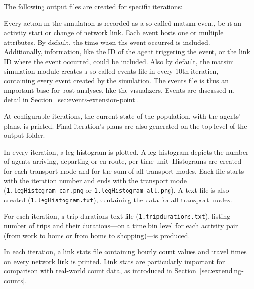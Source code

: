 The following output files are created for specific iterations:
\begin{description}\styleDescription

\item[Events:] Every action in the simulation is recorded as a so-called \gls{matsim} \gls{event}, be it an activity start or change of network link. Each \gls{event} hosts one or multiple attributes. By default, the time when the \gls{event} occurred is included. Additionally, information, like the ID of the agent triggering the event, or the link ID where the \gls{event} occurred, could be included. Also by default, the \gls{matsim} simulation module creates a so-called events file in every 10th iteration, containing every \gls{event}  created by the simulation. The events file is thus an important base for post-analyses, like the visualizers. Events are discussed in detail in Section~\ref{sec:events-extension-point}.

\item[Plans:] At configurable iterations, the current state of the population, with the agents' plans, is printed.
%
Final iteration's plans 
are also generated on the top level of the output folder.

\item[Leg Histogram:]
In every iteration, a leg histogram is plotted. A leg histogram depicts the number of agents arriving, departing or en route, per time unit. Histograms are created for each transport mode and for the sum of all transport modes. Each file starts with the iteration number and ends with the transport mode (\eg \lstinline|1.legHistogram_car.png| or \lstinline|1.legHistogram_all.png|). A text file is also created (\eg \lstinline|1.legHistogram.txt|), containing the data for all transport modes.

\item[Trip Durations:]
For each iteration, a \gls{trip} durations text file (\eg \lstinline|1.tripdurations.txt|), listing number of trips and their durations---on a time bin level for each activity pair (\eg from work to home or from home to shopping)---is produced.

\item[Link Stats:] In each iteration, a link stats file containing hourly count values and travel times on every network link is printed. Link stats are particularly important for comparison with real-world count data, as introduced in Section~\ref{sec:extending-counts}.

%
\end{description}

